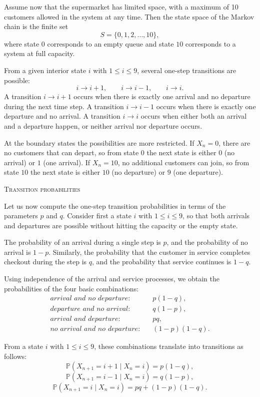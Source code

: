 Assume now that the supermarket has limited space, with a maximum of 10 customers allowed in the system at any time.
Then the state space of the Markov chain is the finite set
\[
S = \{0,1,2,\dots,10\},
\]
where state \(0\) corresponds to an empty queue and state \(10\) corresponds to a system at full capacity.

From a given interior state \(i\) with \(1 \le i \le 9\), several one-step transitions are possible:
\[
i \longrightarrow i+1,
\qquad
i \longrightarrow i-1,
\qquad
i \longrightarrow i.
\]
A transition \(i \to i+1\) occurs when there is exactly one arrival and no departure during the next time step.
A transition \(i \to i-1\) occurs when there is exactly one departure and no arrival.
A transition \(i \to i\) occurs when either both an arrival and a departure happen, or neither arrival nor departure occurs.

At the boundary states the possibilities are more restricted.
If \(X_n = 0\), there are no customers that can depart, so from state \(0\) the next state is either \(0\) (no arrival) or \(1\) (one arrival).
If \(X_n = 10\), no additional customers can join, so from state \(10\) the next state is either \(10\) (no departure) or \(9\) (one departure).

\bigskip
\textsc{Transition probabilities}

Let us now compute the one-step transition probabilities in terms of the parameters \(p\) and \(q\).
Consider first a state \(i\) with \(1 \le i \le 9\), so that both arrivals and departures are possible without hitting the capacity or the empty state.

The probability of an arrival during a single step is \(p\), and the probability of no arrival is \(1-p\).
Similarly, the probability that the customer in service completes checkout during the step is \(q\), and the probability that service continues is \(1-q\).

Using independence of the arrival and service processes, we obtain the probabilities of the four basic combinations:
\[
\begin{aligned}
\textit{arrival and no departure:}&
\quad
p (1-q), \\
\textit{departure and no arrival:}&
\quad
q (1-p), \\
\textit{arrival and departure:}&
\quad
p q, \\
\textit{no arrival and no departure:}&
\quad
(1-p)(1-q).
\end{aligned}
\]

From a state \(i\) with \(1 \le i \le 9\), these combinations translate into transitions as follows:
\[
\mathbb{P}(X_{n+1} = i+1 \mid X_n = i)
=
p (1-q),
\]
\[
\mathbb{P}(X_{n+1} = i-1 \mid X_n = i)
=
q (1-p),
\]
\[
\mathbb{P}(X_{n+1} = i \mid X_n = i)
=
p q + (1-p)(1-q).
\]

